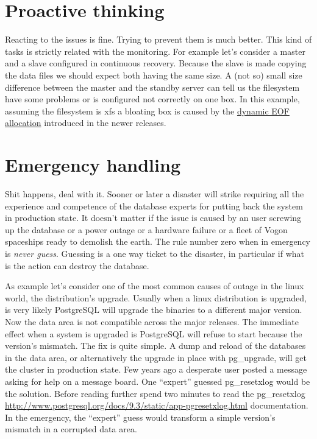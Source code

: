 \section{Proactive thinking}
Reacting to the issues is fine. Trying to prevent them is much better. This kind of tasks is strictly 
related with the monitoring. For example let's consider a master and a slave configured in continuous 
recovery. Because the slave is made copying the data files we should expect both having the same size. 
A (not so) small size difference between the master and the standby server can tell us the filesystem have 
some problems or is configured not correctly on one box. In this example, assuming the filesystem is xfs a 
bloating box is caused by the 
\href{
http://serverfault.com/questions/406069/why-are-my-xfs-filesystems-suddenly-consuming-more-space-and-full-of
-sparse-file}{dynamic EOF allocation} introduced in the newer releases.

\section{Emergency handling}
Shit happens, deal with it. Sooner or later a disaster will strike requiring all the experience and 
competence of the database experts for putting back the system in production state. It doesn't matter if the 
issue is caused by an user screwing up the database or a power outage or a hardware failure or a fleet of 
Vogon spaceships ready to demolish the earth. The rule number zero when in emergency is \textit{never 
guess}. Guessing is a one way ticket to the disaster, in particular if what is the action 
can destroy the database.\newline

As example let's consider one of the most common causes of outage in the linux world, the distribution's 
upgrade. Usually when a linux distribution is upgraded, is very likely PostgreSQL will upgrade the 
binaries to a different major version. Now the data area is not compatible across the major releases. The 
immediate effect when a system is upgraded is PostgreSQL will refuse to start because the version's 
mismatch. The fix is quite simple. A dump and reload of the databases in the data area, or alternatively 
the upgrade in place with pg\_upgrade, will get the cluster in production state. Few years ago a 
desperate user posted a message asking for help on a message board. One ``expert'' guessed 
pg\_resetxlog would be the solution. Before reading further spend two minutes to  read the 
pg\_resetxlog 
\href{http://www.postgresql.org/docs/9.3/static/app-pgresetxlog.html}{
http://www.postgresql.org/docs/9.3/static/app-pgresetxlog.html} documentation. In the emergency, the 
``expert'' guess would transform a simple version's mismatch in a corrupted data area.

